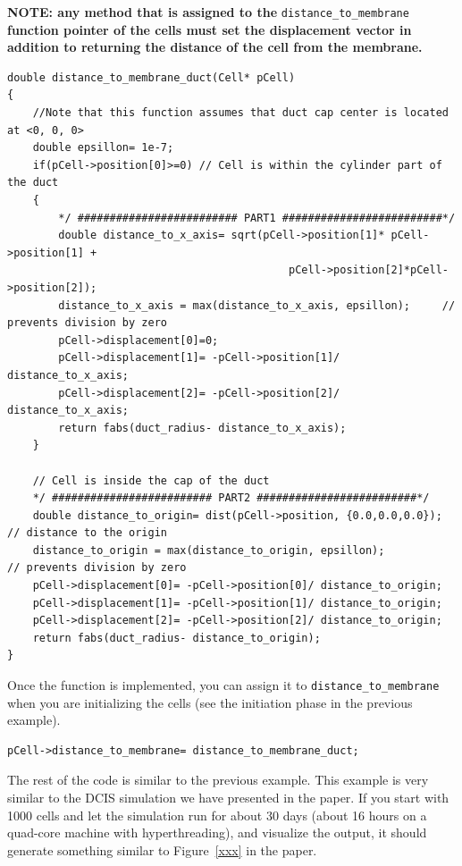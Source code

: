 \documentclass[11pt]{article}
\begin{document}
\textbf{NOTE: any method that is assigned to the} \verb:distance_to_membrane: \textbf{function pointer of the cells must set the displacement vector in addition to returning the distance of the cell from the membrane.}

\begin{verbatim}
double distance_to_membrane_duct(Cell* pCell)
{
    //Note that this function assumes that duct cap center is located at <0, 0, 0>
    double epsillon= 1e-7;
    if(pCell->position[0]>=0) // Cell is within the cylinder part of the duct
    {
        */ ######################### PART1 #########################*/
        double distance_to_x_axis= sqrt(pCell->position[1]* pCell->position[1] + 
                                            pCell->position[2]*pCell->position[2]);
        distance_to_x_axis = max(distance_to_x_axis, epsillon);		// prevents division by zero
        pCell->displacement[0]=0;
        pCell->displacement[1]= -pCell->position[1]/ distance_to_x_axis;
        pCell->displacement[2]= -pCell->position[2]/ distance_to_x_axis;
        return fabs(duct_radius- distance_to_x_axis);
    }

    // Cell is inside the cap of the duct
    */ ######################### PART2 #########################*/
    double distance_to_origin= dist(pCell->position, {0.0,0.0,0.0});  // distance to the origin
    distance_to_origin = max(distance_to_origin, epsillon);			  // prevents division by zero
    pCell->displacement[0]= -pCell->position[0]/ distance_to_origin;
    pCell->displacement[1]= -pCell->position[1]/ distance_to_origin;
    pCell->displacement[2]= -pCell->position[2]/ distance_to_origin;
    return fabs(duct_radius- distance_to_origin);
}
\end{verbatim}

Once the function is implemented, you can assign it to \verb:distance_to_membrane: when you are initializing the cells (see the initiation phase in the previous example). 

\begin{verbatim}
pCell->distance_to_membrane= distance_to_membrane_duct;
\end{verbatim}

The rest of the code is similar to the previous example. This example is very similar to the DCIS simulation we have presented in the paper. If you start with 1000 cells and let the simulation run for about 30 days (about 16 hours on a quad-core machine with hyperthreading), and visualize the output, it should generate something similar to Figure~\ref{xxx} in the paper.
\end{document}
